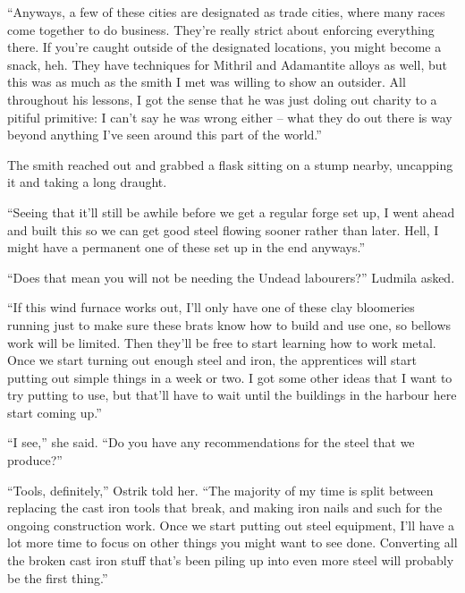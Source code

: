  

“Anyways, a few of these cities are designated as trade cities, where many races come together to do business. They’re really strict about enforcing everything there. If you’re caught outside of the designated locations, you might become a snack, heh. They have techniques for Mithril and Adamantite alloys as well, but this was as much as the smith I met was willing to show an outsider. All throughout his lessons, I got the sense that he was just doling out charity to a pitiful primitive: I can’t say he was wrong either – what they do out there is way beyond anything I’ve seen around this part of the world.”

 

The smith reached out and grabbed a flask sitting on a stump nearby, uncapping it and taking a long draught.

 

“Seeing that it’ll still be awhile before we get a regular forge set up, I went ahead and built this so we can get good steel flowing sooner rather than later. Hell, I might have a permanent one of these set up in the end anyways.”

 

“Does that mean you will not be needing the Undead labourers?” Ludmila asked.

 

“If this wind furnace works out, I’ll only have one of these clay bloomeries running just to make sure these brats know how to build and use one, so bellows work will be limited. Then they’ll be free to start learning how to work metal. Once we start turning out enough steel and iron, the apprentices will start putting out simple things in a week or two. I got some other ideas that I want to try putting to use, but that’ll have to wait until the buildings in the harbour here start coming up.”

 

“I see,” she said. “Do you have any recommendations for the steel that we produce?”

 

“Tools, definitely,” Ostrik told her. “The majority of my time is split between replacing the cast iron tools that break, and making iron nails and such for the ongoing construction work. Once we start putting out steel equipment, I’ll have a lot more time to focus on other things you might want to see done. Converting all the broken cast iron stuff that’s been piling up into even more steel will probably be the first thing.”

